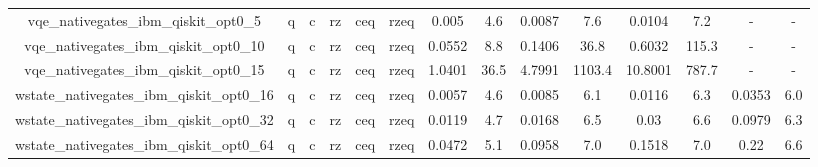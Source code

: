 \begin{table}[htb]
{\begin{tabular}{|c|c|c|c|c|c|c|c|c|c|c|c|c|c|}
vqe_nativegates_ibm_qiskit_opt0_5 & q & c & rz & ceq & rzeq & 0.005 & 4.6 & 0.0087 & 7.6 & 0.0104 & 7.2 & - & - \\ 
vqe_nativegates_ibm_qiskit_opt0_10 & q & c & rz & ceq & rzeq & 0.0552 & 8.8 & 0.1406 & 36.8 & 0.6032 & 115.3 & - & - \\ 
vqe_nativegates_ibm_qiskit_opt0_15 & q & c & rz & ceq & rzeq & 1.0401 & 36.5 & 4.7991 & 1103.4 & 10.8001 & 787.7 & - & - \\ 
wstate_nativegates_ibm_qiskit_opt0_16 & q & c & rz & ceq & rzeq & 0.0057 & 4.6 & 0.0085 & 6.1 & 0.0116 & 6.3 & 0.0353 & 6.0 \\ 
wstate_nativegates_ibm_qiskit_opt0_32 & q & c & rz & ceq & rzeq & 0.0119 & 4.7 & 0.0168 & 6.5 & 0.03 & 6.6 & 0.0979 & 6.3 \\ 
wstate_nativegates_ibm_qiskit_opt0_64 & q & c & rz & ceq & rzeq & 0.0472 & 5.1 & 0.0958 & 7.0 & 0.1518 & 7.0 & 0.22 & 6.6 \\ 
\hline 
\end{tabular}} 
\end{table} 
